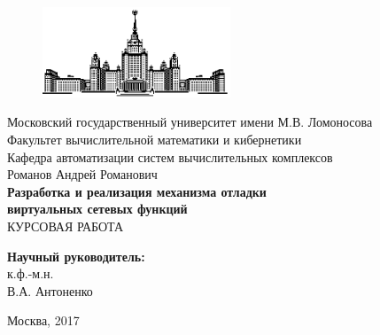 \documentclass[oneside,final,14pt,a4paper]{extreport}
\begin{document}
\def\contentsname{Содержание} %





\thispagestyle{empty}
\begin{titlepage}

\begin{figure}
	\centering
	\includegraphics[width=0.5\textwidth]{msu}\\
\end{figure}

\begin{spacing}{1.0} %
\begin{center} %
	{\small
		Московский государственный университет имени М.В. Ломоносова \\
		Факультет вычислительной математики и кибернетики \\
		Кафедра автоматизации систем вычислительных комплексов \\
	}
	\vspace{4cm}
	{\large Романов Андрей Романович \\}
	\vspace{1cm}
	{\large\bfseries
	    Разработка и реализация механизма отладки \\
	    виртуальных сетевых функций \\
	}
	\vspace{1cm}
	КУРСОВАЯ РАБОТА
\end{center}
\vfill
\begin{flushright}
\begin{small}
	{\bfseries Научный руководитель: \\}
	к.ф.-м.н. \\
	В.А. Антоненко \\
\end{small}
\end{flushright}

\vfill

\centerline{Москва, 2017}
\end{spacing}
\end{titlepage}
\setcounter{page}{2}
\end{document}
